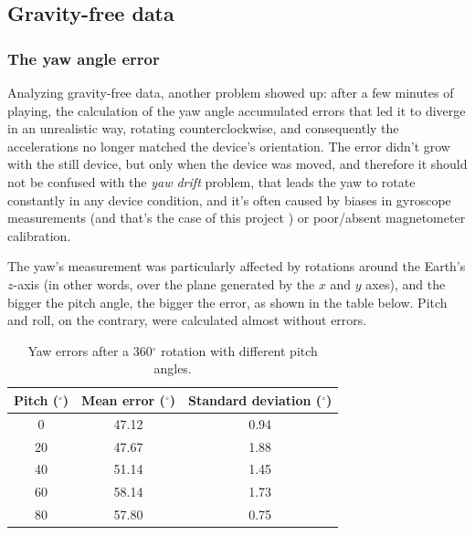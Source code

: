 \subsection{Gravity-free data}
\subsubsection{The yaw angle error}
Analyzing gravity-free data, another problem showed up: after a few minutes of playing, the calculation of the yaw angle accumulated errors that led it to diverge in an unrealistic way, rotating counterclockwise, and consequently the accelerations no longer matched the device's orientation. The error didn't grow with the still device, but only when the device was moved, and therefore it should not be confused with the \textit{yaw drift} problem, that leads the yaw to rotate constantly in any device condition, and it's often caused by biases in gyroscope measurements (and that's the case of this project \cite{Pio19}) or poor/absent magnetometer calibration.
\bigbreak

The yaw's measurement was particularly affected by rotations around the Earth's $z$-axis (in other words, over the plane generated by the $x$ and $y$ axes), and the bigger the pitch angle, the bigger the error, as shown in the table below. Pitch and roll, on the contrary, were calculated almost without errors.
\bigbreak

\begin{table}[ht!]
	\centering
	\begin{tabular}{c|cc}
		\textbf{Pitch} ($^{\circ}$) & \textbf{Mean error} ($^{\circ}$) & \textbf{Standard deviation} ($^{\circ}$) \\ \hline
		0                           & 47.12                            & 0.94                                     \\
		\rowcolor[HTML]{EFEFEF}
		20                          & 47.67                            & 1.88                                     \\
		40                          & 51.14                            & 1.45                                     \\
		\rowcolor[HTML]{EFEFEF}
		60                          & 58.14                            & 1.73                                     \\
		80                          & 57.80                            & 0.75
		\end{tabular}
	\caption{Yaw errors after a 360$^{\circ}$ rotation with different pitch angles.}
\end{table}

